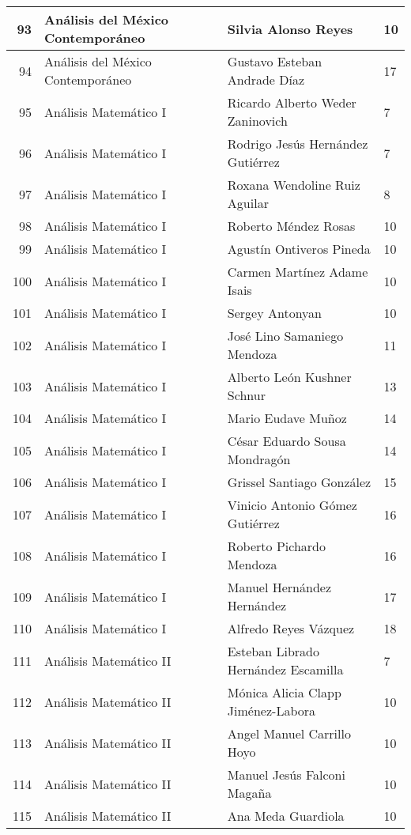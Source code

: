 \begin{table}[ht]
\begin{tabular}{rlll}
  93 & Análisis del México Contemporáneo & Silvia Alonso Reyes & 10 \\ \hline
  94 & Análisis del México Contemporáneo & Gustavo Esteban Andrade Díaz & 17 \\ \hline
  95 & Análisis Matemático I & Ricardo Alberto Weder Zaninovich & 7 \\ \hline
  96 & Análisis Matemático I & Rodrigo Jesús Hernández Gutiérrez & 7 \\ \hline
  97 & Análisis Matemático I & Roxana Wendoline Ruiz Aguilar & 8 \\ \hline
  98 & Análisis Matemático I & Roberto Méndez Rosas & 10 \\ \hline
  99 & Análisis Matemático I & Agustín Ontiveros Pineda & 10 \\ \hline
  100 & Análisis Matemático I & Carmen Martínez Adame Isais & 10 \\ \hline
  101 & Análisis Matemático I & Sergey Antonyan & 10 \\ \hline
  102 & Análisis Matemático I & José Lino Samaniego Mendoza & 11 \\ \hline
  103 & Análisis Matemático I & Alberto León Kushner Schnur & 13 \\ \hline
  104 & Análisis Matemático I & Mario Eudave Muñoz & 14 \\ \hline
  105 & Análisis Matemático I & César Eduardo Sousa Mondragón & 14 \\ \hline
  106 & Análisis Matemático I & Grissel Santiago González & 15 \\ \hline
  107 & Análisis Matemático I & Vinicio Antonio Gómez Gutiérrez & 16 \\ \hline
  108 & Análisis Matemático I & Roberto Pichardo Mendoza & 16 \\ \hline
  109 & Análisis Matemático I & Manuel Hernández Hernández & 17 \\ \hline
  110 & Análisis Matemático I & Alfredo Reyes Vázquez & 18 \\ \hline
  111 & Análisis Matemático II & Esteban Librado Hernández Escamilla & 7 \\ \hline
  112 & Análisis Matemático II & Mónica Alicia Clapp Jiménez-Labora & 10 \\ \hline
  113 & Análisis Matemático II & Angel Manuel Carrillo Hoyo & 10 \\ \hline
  114 & Análisis Matemático II & Manuel Jesús Falconi Magaña & 10 \\ \hline
  115 & Análisis Matemático II & Ana Meda Guardiola & 10 \\ \hline

\end{tabular}
\end{table}
